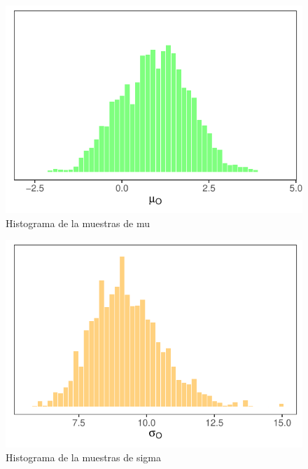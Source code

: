 \documentclass[
]{article}
\begin{document}
\begin{figure}

{\centering \includegraphics{TP-2---El-Dibu-de-la-vida_files/figure-latex/f23-1} 

}

\caption{Histograma de la muestras de mu}\label{fig:f23}
\end{figure}

\begin{figure}

{\centering \includegraphics{TP-2---El-Dibu-de-la-vida_files/figure-latex/f24-1} 

}

\caption{Histograma de la muestras de sigma}\label{fig:f24}
\end{figure}
\end{document}

